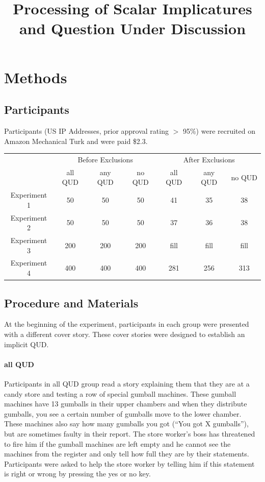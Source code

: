 \documentclass[12pt]{article}
\title{Processing of Scalar Implicatures and Question Under Discussion}
\begin{document}
 

\maketitle 

\section{Methods}
    \subsection*{Participants}

Participants (US IP Addresses, prior approval rating $>$ 95\%) were recruited on Amazon Mechanical Turk and were paid \$2.3.

\begin{table}[h]
\begin{tabular}{ccccccc}
& \multicolumn{3}{c}{Before Exclusions} & \multicolumn{3}{c}{After Exclusions} \\
& all QUD & any QUD & no QUD & all QUD & any QUD & no QUD \\
Experiment 1 & 50 & 50 & 50 & 41 & 35 & 38 \\
Experiment 2 & 50 & 50 & 50 & 37 & 36 & 38 \\
Experiment 3 & 200 & 200 & 200 & fill & fill & fill \\
Experiment 4 & 400 & 400 & 400 & 281 & 256 & 313
\end{tabular}
\end{table}

    \subsection*{Procedure and Materials}

At the beginning of the experiment, participants in each group were presented with a different cover story. These cover stories were designed to establish an implicit QUD.
\paragraph{all QUD} Participants in all QUD group read a story explaining them that they are at a candy store and testing a row of special gumball machines. These gumball machines have 13 gumballs in their upper chambers and when they distribute gumballs, you see a certain number of gumballs move to the lower chamber. These machines also say how many gumballs you got (“You got X gumballs”), but are sometimes faulty in their report. The store worker’s boss has threatened to fire him if the gumball machines are left empty and he cannot see the machines from the register and only tell how full they are by their statements. Participants were asked to help the store worker by telling him if this statement is right or wrong by pressing the yes or no key.
\end{document}
